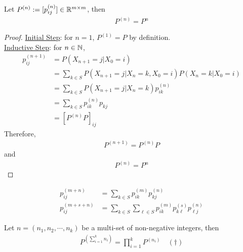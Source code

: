 \documentclass{article}
\begin{document}
    \begin{proposition}
    Let $P^{(n)} := [p_{ij}^{(n)}] \in \mathbb{R}^{m \times m}$, then
    	\begin{align}
    		P^{(n)} = P^n
    	\end{align}
    \end{proposition}
    \begin{proof}
    	\ul{Initial Step}: for $n = 1$, $P^{(1)} = P$ by definition. \\
    	\ul{Inductive Step}: for $n \in \mathbb{N}$,
    	\begin{align}
    		p_{ij}^{(n+1)} &= P(X_{n+1}=j|X_0=i) \\
    		&= \sum_{k \in S} P(X_{n+1}=j|X_n = k, X_0=i) P(X_n=k|X_0=i) \\
    		&= \sum_{k \in S} P(X_{n+1}=j|X_n = k) p_{ik}^{(n)} \\
    		&= \sum_{k \in S} p_{ik}^{(n)} p_{kj} \\
    		&= [P^{(n)} P]_{ij}
    	\end{align}
    	Therefore,
    	\begin{align}
    		P^{(n+1)} = P^{(n)} P
    	\end{align}
    	and 
    	\begin{align}
    		P^{(n)} = P^n
    	\end{align}
    \end{proof}
    
    \begin{theorem}
    	\begin{align}
    		p_{i j}^{(m+n)} &=\sum_{k \in S} p_{i k}^{(m)} p_{k j}^{(n)} \\
    		p_{i j}^{(m+s+n)}&=\sum_{k \in S} \sum_{\ell \in S} p_{i k}^{(m)} p_{k \ell}^{(s)} p_{\ell j}^{(n)}
    	\end{align}
    \end{theorem}
    
    \begin{theorem}
    	Let $n = (n_1, n_2, \cdots, n_k)$ be a multi-set of non-negative integers, then
    	\begin{align}
    		P^{(\sum_{i=1}^k n_i)} = \prod_{i=1}^k P^{(n_i)}\quad (\dagger)
    	\end{align}
    \end{theorem}
    
\end{document}

